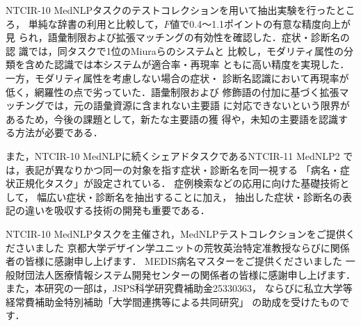 \documentclass[japanese]{jnlp_1.4}
\begin{document}
NTCIR-10 MedNLPタスクのテストコレクションを用いて抽出実験を行ったところ，
単純な辞書の利用と比較して，$F$値で0.4〜1.1ポイントの有意な精度向上が見
られ，語彙制限および拡張マッチングの有効性を確認した．症状・診断名の認
識では，同タスクで1位のMiuraら\cite{miura2013incorporating}のシステムと
比較し，モダリティ属性の分類を含めた認識では本システムが適合率・再現率
ともに高い精度を実現した．一方，モダリティ属性を考慮しない場合の症状・
診断名認識において再現率が低く，網羅性の点で劣っていた．語彙制限および
修飾語の付加に基づく拡張マッチングでは，元の語彙資源に含まれない主要語
に対応できないという限界があるため，今後の課題として，新たな主要語の獲
得や，未知の主要語を認識する方法が必要である．

また，NTCIR-10 MedNLPに続くシェアドタスクであるNTCIR-11 MedNLP2 \cite{aramaki2014overview}
では，表記が異なりかつ同一の対象を指す症状・診断名を同一視する
「病名・症状正規化タスク」が設定されている．
症例検索などの応用に向けた基礎技術として，
幅広い症状・診断名を抽出することに加え，
抽出した症状・診断名の表記の違いを吸収する技術の開発も重要である．


\acknowledgment
NTCIR-10 MedNLPタスクを主催され，MedNLPテストコレクションをご提供くださいました
京都大学デザイン学ユニットの荒牧英治特定准教授ならびに関係者の皆様に感謝申し上げます．
MEDIS病名マスターをご提供くださいました
一般財団法人医療情報システム開発センターの関係者の皆様に感謝申し上げます．
また，本研究の一部は，JSPS科学研究費補助金25330363，
ならびに私立大学等経常費補助金特別補助「大学間連携等による共同研究」
の助成を受けたものです．
\end{document}

